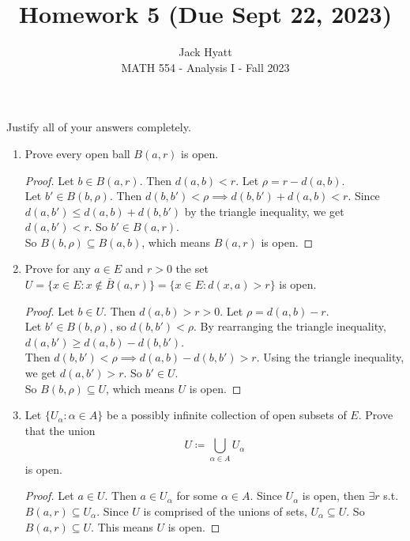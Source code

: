 \documentclass[14pt]{extarticle}
\begin{document}
	
	
	
	\title{Homework 5 (Due Sept 22, 2023)}
	\author{Jack Hyatt\\ %
		MATH 554 - Analysis I - Fall 2023} 
	
	\maketitle
	
	Justify all of your answers completely.\\
	
	
	\medskip 
	
	\begin{enumerate}
		\item Prove every open ball $B(a,r)$ is open.
		\begin{proof}
			Let $b \in B(a,r)$. Then $d(a,b) < r$. Let $\rho = r-d(a,b)$.\\
			Let $b' \in B(b,\rho)$. Then $d(b,b') < \rho \implies d(b,b') + d(a,b) < r$. Since $d(a,b') \leq d(a,b) + d(b,b')$ by the triangle inequality, we get $d(a,b') < r$. So $b' \in B(a,r)$.\\
			So $B(b,\rho) \subseteq B(a,b)$, which means $B(a,r)$ is open.
		\end{proof}
		
		\item Prove for any $a \in E$ and $r > 0$ the set $U = \{x \in E : x \nin \bar{B}(a,r)\} = \{x \in E : d(x,a) > r\}$ is open.
		\begin{proof}
			Let $b \in U$. Then $d(a,b) > r > 0$. Let $\rho = d(a,b)-r$.\\
			Let $b' \in B(b,\rho)$, so $d(b,b') < \rho$. By rearranging the triangle inequality, $d(a,b') \geq d(a,b) - d(b,b')$.\\
			Then $d(b,b') < \rho \implies d(a,b)-d(b,b') > r$. Using the triangle inequality, we get $d(a,b') > r$. So $b' \in U$.\\
			So $B(b,\rho) \subseteq U$, which means $U$ is open.
		\end{proof}
		
		\item Let $\{U_\alpha : \alpha \in A\}$ be a possibly infinite collection of open subsets of $E$. Prove that the union 
		\[U \coloneq \bigcup_{\alpha \in A} U_\alpha\] is open.
		\begin{proof}
			Let $a \in U$. Then $a \in U_\alpha$ for some $\alpha \in A$. Since $U_\alpha$ is open, then $\exists r$ s.t. $B(a,r) \subseteq U_\alpha$. Since $U$ is comprised of the unions of sets, $U_\alpha \subseteq U$. So $B(a,r) \subseteq U$. This means $U$ is open.
		\end{proof}
		

\end{enumerate}
\end{document}

